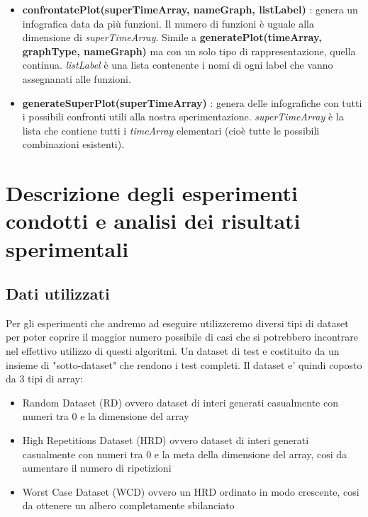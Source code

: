 \begin{itemize}
\begin{itemize}
        \item \textbf{confrontatePlot(superTimeArray, nameGraph, listLabel)} :  genera un infografica data da più funzioni. Il numero di funzioni è uguale alla dimensione di \textit{superTimeArray}. Simile a \textbf{generatePlot(timeArray, graphType, nameGraph)} ma con un solo tipo di rappresentazione, quella continua. \textit{listLabel} è una lista contenente i nomi di ogni label che vanno assegnanati alle funzioni.
        
        \item \textbf{generateSuperPlot(superTimeArray)} : genera delle infografiche con tutti i possibili confronti utili alla nostra sperimentazione. \textit{superTimeArray} è la lista che contiene tutti i \textit{timeArray} elementari (cioè tutte le possibili combinazioni esistenti).
        
    \end{itemize}
    
\end{itemize}

\newpage
\section{Descrizione degli esperimenti condotti e analisi dei risultati sperimentali}

\subsection{Dati utilizzati}
\label{sec:DatiUtilizzati_1}
Per gli esperimenti che andremo ad eseguire utilizzeremo diversi tipi di dataset per poter coprire il maggior numero possibile di casi che 
si potrebbero incontrare nel effettivo utilizzo di questi algoritmi. Un dataset di test e costituito da un insieme di "sotto-dataset" che rendono i test completi.
Il dataset e' quindi coposto da 3 tipi di array:
\begin{itemize}
  \item Random Dataset (RD) ovvero dataset di interi generati casualmente con numeri tra 0 e la dimensione del array
  \item High Repetitions Dataset (HRD) ovvero dataset di interi generati casualmente con numeri tra 0 e la meta della dimensione del array, cosi da aumentare il numero di ripetizioni 
  \item Worst Case Dataset (WCD) ovvero un HRD ordinato in modo crescente, cosi da ottenere un albero completamente sbilanciato
\end{itemize}

